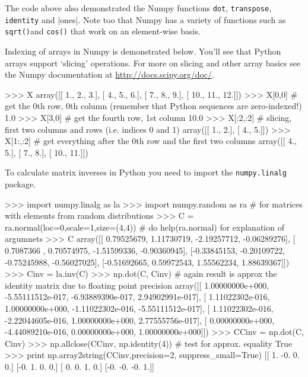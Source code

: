 %
The code above also demonstrated the Numpy functions \lstinline!dot!,
\lstinline!transpose!, \lstinline!identity! and |ones|. Note too that Numpy
has a variety of functions such as \lstinline!sqrt()!and
\lstinline!cos()! that work on an element-wise basis.

Indexing of arrays in Numpy is demonstrated below. You'll see that
Python arrays support `slicing' operations. For more on slicing and
other array basics see the Numpy documentation at
\href{http://docs.scipy.org/doc/}{http://docs.scipy.org/doc/}.

\begin{python}
>>> X
array([[  1.,   2.,   3.],
       [  4.,   5.,   6.],
       [  7.,   8.,   9.],
       [ 10.,  11.,  12.]])
>>> X[0,0] # get the 0th row, 0th column (remember that Python sequences are zero-indexed!)
1.0
>>> X[3,0] # get the fourth row, 1st column
10.0
>>> X[:2,:2]  # slicing, first two columns and rows (i.e. indices 0 and 1)
array([[ 1.,  2.],
       [ 4.,  5.]])
>>> X[1:,:2] # get everything after the 0th row and  the first two columns
array([[  4.,   5.],
       [  7.,   8.],
       [ 10.,  11.]])
\end{python}
To calculate matrix inverses in Python you need to import the
\lstinline!numpy.linalg! package.

\begin{python}
>>> import numpy.linalg as la
>>> import numpy.random as ra  # for matrices with elements from random distributions
>>> C = ra.normal(loc=0,scale=1,size=(4,4)) # do help(ra.normal) for explanation of argumnets
>>> C
array([[ 0.79525679,  1.11730719, -2.19257712, -0.06289276],
       [ 0.7087366 ,  0.70574975, -1.51599336, -0.90360945],
       [-0.33845153, -0.20109722, -0.75245988, -0.56027025],
       [-0.51692665,  0.59972543,  1.55562234,  1.88639367]])
>>> Cinv = la.inv(C)
>>> np.dot(C, Cinv) # again result is approx the identity matrix due to floating point precision
array([[ 1.00000000e+000, -5.55111512e-017, -6.93889390e-017,  2.94902991e-017],
       [ 1.11022302e-016,  1.00000000e+000, -1.11022302e-016, -5.55111512e-017],
       [ 1.11022302e-016, -2.22044605e-016,  1.00000000e+000,  2.77555756e-017],
       [ 0.00000000e+000, -4.44089210e-016,  0.00000000e+000,  1.00000000e+000]])
>>> CCinv = np.dot(C, Cinv)
>>> np.allclose(CCinv, np.identity(4))  #  test for approx. equality
True
>>> print np.array2string(CCinv,precision=2, suppress_small=True)
[[ 1. -0.  0.  0.]
 [-0.  1.  0.  0.]
 [ 0.  0.  1.  0.]
 [-0. -0. -0.  1.]]
\end{python}




